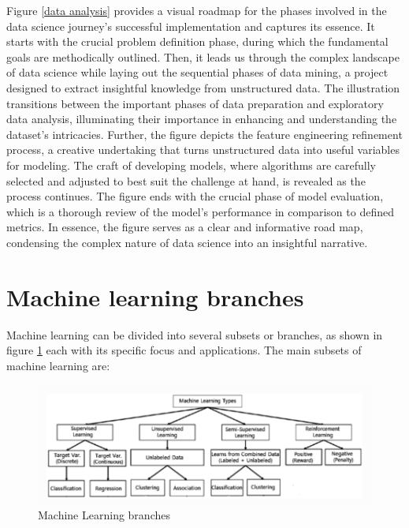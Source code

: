 \documentclass[a4paper,12pt]{report}%
\renewcommand{\\}{\vspace*{0.5\baselineskip} \newline}
\begin{document}
\noindent Figure \ref{data analysis} provides a visual roadmap for the phases involved in the data science journey's successful implementation and captures its essence. It starts with the crucial problem definition phase, during which the fundamental goals are methodically outlined. Then, it leads us through the complex landscape of data science while laying out the sequential phases of data mining, a project designed to extract insightful knowledge from unstructured data. The illustration transitions between the important phases of data preparation and exploratory data analysis, illuminating their importance in enhancing and understanding the dataset's intricacies.
Further, the figure depicts the feature engineering refinement process, a creative undertaking that turns unstructured data into useful variables for modeling. The craft of developing models, where algorithms are carefully selected and adjusted to best suit the challenge at hand, is revealed as the process continues. The figure ends with the crucial phase of model evaluation, which is a thorough review of the model's performance in comparison to defined metrics. In essence, the figure serves as a clear and informative road map, condensing the complex nature of data science into an insightful narrative.


\bigskip
\bigskip
\bigskip
\bigskip
\bigskip
\bigskip
\bigskip
\bigskip
\bigskip
\bigskip
\bigskip
\bigskip
\bigskip
\bigskip
\bigskip
\bigskip
\bigskip
\bigskip
\bigskip
\bigskip
\bigskip
\section{Machine learning branches}
Machine learning can be divided into several subsets or branches, as shown in figure \ref{Machine Learning branches} each with its specific focus and applications. The main subsets of machine learning are:



\begin{figure}[h]
\centering
	\includegraphics[scale=0.8]{images/ml techniques.png}\\
	\begin{footnotesize}
		\caption{Machine Learning branches \cite{22}}
		\label{Machine Learning branches}
	\end{footnotesize}
\end{figure}
\end{document}
